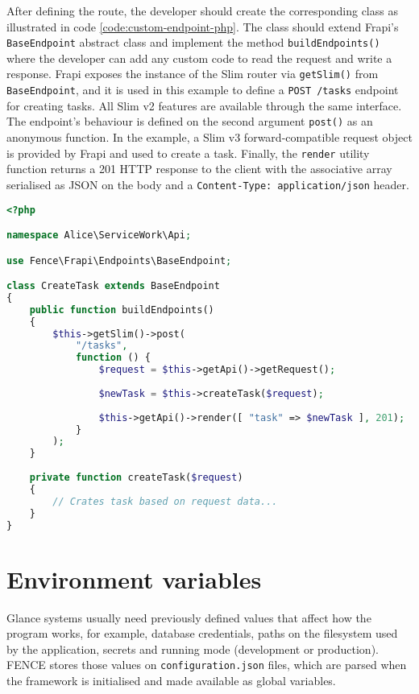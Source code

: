 After defining the route, the developer should create the corresponding class as illustrated in code \autoref{code:custom-endpoint-php}. The class should extend Frapi's \texttt{BaseEndpoint} abstract class and implement the method \texttt{buildEndpoints()}  where the developer can add any custom code to read the request and write a response. Frapi exposes the instance of the Slim router via \texttt{getSlim()} from \texttt{BaseEndpoint}, and it is used in this example to define a \texttt{POST /tasks} endpoint for creating tasks. All Slim v2 features \cite{slim-2-doc} are available through the same interface. The endpoint's behaviour is defined on the second argument \texttt{post()} as an anonymous function. In the example, a Slim v3 forward-compatible request object is provided by Frapi and used to create a task. Finally, the \texttt{render} utility function returns a 201 HTTP response to the client with the associative array serialised as JSON on the body and a \texttt{Content-Type: application/json} header.

\begin{lstlisting}[language=PHP,label={code:custom-endpoint-php},caption={PHP class with the custom endpoint definition for creating a Service Work task.}]
<?php

namespace Alice\ServiceWork\Api;

use Fence\Frapi\Endpoints\BaseEndpoint;

class CreateTask extends BaseEndpoint
{
    public function buildEndpoints()
    {
        $this->getSlim()->post(
            "/tasks",
            function () {
			    $request = $this->getApi()->getRequest();
			    
                $newTask = $this->createTask($request);
                
                $this->getApi()->render([ "task" => $newTask ], 201);
            }
        );
    }
    
    private function createTask($request)
    {
        // Crates task based on request data...
    }
}
\end{lstlisting}

\section{Environment variables}

Glance systems usually need previously defined values that affect how the program works, for example, database credentials, paths on the filesystem used by the application, secrets and running mode (development or production). FENCE stores those values on \texttt{configuration.json} files, which are parsed when the framework is initialised and made available as global variables.

